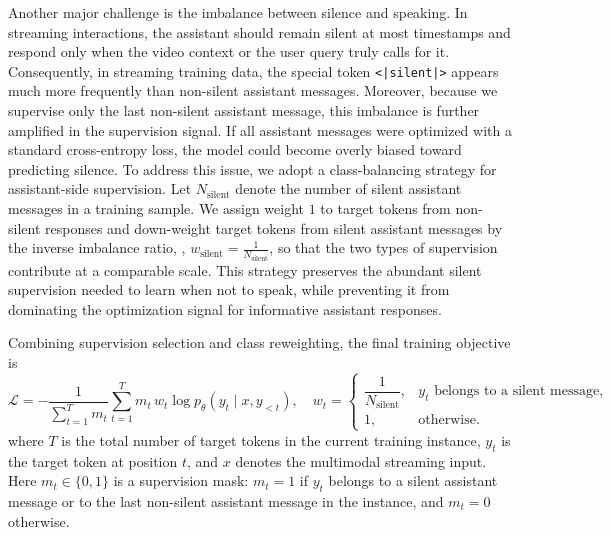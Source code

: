 Another major challenge is the imbalance between silence and speaking. In streaming interactions, the assistant should remain silent at most timestamps and respond only when the video context or the user query truly calls for it. Consequently, in streaming training data, the special token \texttt{<|silent|>} appears much more frequently than non-silent assistant messages. Moreover, because we supervise only the last non-silent assistant message, this imbalance is further amplified in the supervision signal. If all assistant messages were optimized with a standard cross-entropy loss, the model could become overly biased toward predicting silence. To address this issue, we adopt a class-balancing strategy for assistant-side supervision. Let $N_{\text{silent}}$ denote the number of silent assistant messages in a training sample. We assign weight $1$ to target tokens from non-silent responses and down-weight target tokens from silent assistant messages by the inverse imbalance ratio, \ie, $w_{\text{silent}}=\frac{1}{N_{\text{silent}}}$, so that the two types of supervision contribute at a comparable scale. This strategy preserves the abundant silent supervision needed to learn when not to speak, while preventing it from dominating the optimization signal for informative assistant responses.

Combining supervision selection and class reweighting, the final training objective is
\begin{equation}
\mathcal{L}
=
-\frac{1}{\sum_{t=1}^{T} m_t}
\sum_{t=1}^{T}
m_t\, w_t \log p_{\theta}(y_t \mid x, y_{<t}),
\quad
w_t=
\begin{cases}
\dfrac{1}{N_{\text{silent}}}, & y_t \text{ belongs to a silent message},\\[4pt]
1, & \text{otherwise}.
\end{cases}
\end{equation}
where $T$ is the total number of target tokens in the current training instance, $y_t$ is the target token at position $t$, and $x$ denotes the multimodal streaming input. Here $m_t \in \{0,1\}$ is a supervision mask: $m_t=1$ if $y_t$ belongs to a silent assistant message or to the last non-silent assistant message in the instance, and $m_t=0$ otherwise. 

